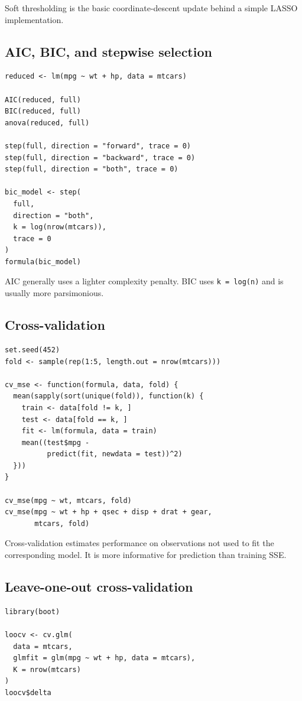 \documentclass[11pt]{article}
\begin{document}
Soft thresholding is the basic coordinate-descent update behind a simple
LASSO implementation.

\subsection{AIC, BIC, and stepwise selection}
\begin{lstlisting}
reduced <- lm(mpg ~ wt + hp, data = mtcars)

AIC(reduced, full)
BIC(reduced, full)
anova(reduced, full)

step(full, direction = "forward", trace = 0)
step(full, direction = "backward", trace = 0)
step(full, direction = "both", trace = 0)

bic_model <- step(
  full,
  direction = "both",
  k = log(nrow(mtcars)),
  trace = 0
)
formula(bic_model)
\end{lstlisting}

AIC generally uses a lighter complexity penalty. BIC uses
\texttt{k = log(n)} and is usually more parsimonious.

\subsection{Cross-validation}
\begin{lstlisting}
set.seed(452)
fold <- sample(rep(1:5, length.out = nrow(mtcars)))

cv_mse <- function(formula, data, fold) {
  mean(sapply(sort(unique(fold)), function(k) {
    train <- data[fold != k, ]
    test <- data[fold == k, ]
    fit <- lm(formula, data = train)
    mean((test$mpg -
          predict(fit, newdata = test))^2)
  }))
}

cv_mse(mpg ~ wt, mtcars, fold)
cv_mse(mpg ~ wt + hp + qsec + disp + drat + gear,
       mtcars, fold)
\end{lstlisting}

Cross-validation estimates performance on observations not used to fit the
corresponding model. It is more informative for prediction than training SSE.

\subsection{Leave-one-out cross-validation}
\begin{lstlisting}
library(boot)

loocv <- cv.glm(
  data = mtcars,
  glmfit = glm(mpg ~ wt + hp, data = mtcars),
  K = nrow(mtcars)
)
loocv$delta
\end{lstlisting}
\end{document}

